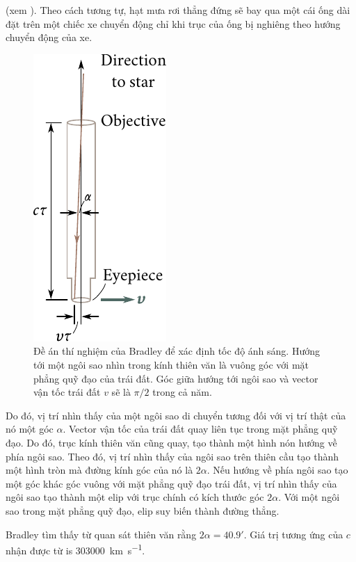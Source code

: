 (xem ).
Theo cách tương tự, hạt mưa rơi thẳng đứng sẽ bay qua một cái ống dài đặt trên một chiếc xe chuyển động chỉ khi trục của ống bị nghiêng theo hướng chuyển động của xe.

\begin{figure}[!htb]
	\begin{center}
		\includegraphics[scale=1]{figures/ch_21/fig_21_1.pdf}
        \caption[]{Đề án thí nghiệm của Bradley để xác định tốc độ ánh sáng. Hướng tới một ngôi sao nhìn trong kính thiên văn là vuông góc với mặt phẳng quỹ đạo của trái đất. Góc giữa hướng tới ngôi sao và vector vận tốc trái đất $v$ sẽ là $\pi/2$ trong cả năm.}
		\label{fig:21_1}
	\end{center}
	\vspace{-0.8cm}
\end{figure}

Do đó, vị trí nhìn thấy của một ngôi sao di chuyển tương đối với vị trí thật của nó một góc $\alpha$.
Vector vận tốc của trái đất quay liên tục trong mặt phẳng quỹ đạo.
Do đó, trục kính thiên văn cũng quay, tạo thành một hình nón hướng về phía ngôi sao.
Theo đó, vị trí nhìn thấy của ngôi sao trên thiên cầu tạo thành một hình tròn mà đường kính góc của nó là $2\alpha$.
Nếu hướng về phía ngôi sao tạo một góc khác góc vuông với mặt phẳng quỹ đạo trái đất, vị trí nhìn thấy của ngôi sao tạo thành một elip với trục chính có kích thước góc $2\alpha$.
Với một ngôi sao trong mặt phẳng quỹ đạo, elip suy biến thành đường thẳng.

Bradley tìm thấy từ quan sát thiên văn rằng  $2\alpha=\ang{;40.9;}$.
Giá trị tương ứng của $c$ nhận được từ  is \SI{303000}{km.s^{-1}}.

